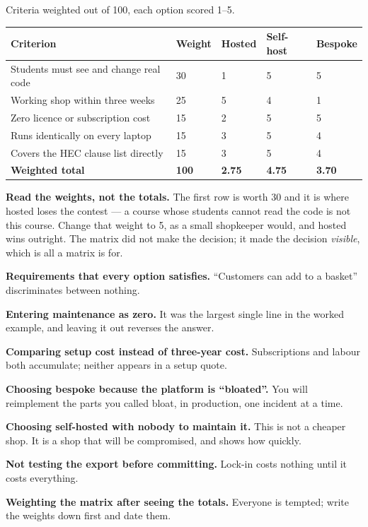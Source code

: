 \begin{examplebox}
Criteria weighted out of 100, each option scored 1--5.

\begin{longtable}{@{}L{4.8cm}L{1.5cm}L{1.9cm}L{1.9cm}L{1.9cm}@{}}
\toprule
{}
\textbf{Criterion} & \textbf{Weight} & \textbf{Hosted} & \textbf{Self-host} &
\textbf{Bespoke} \\
\midrule
\endhead
Students must see and change real code & 30 & 1 & 5 & 5 \\
Working shop within three weeks & 25 & 5 & 4 & 1 \\
Zero licence or subscription cost & 15 & 2 & 5 & 5 \\
Runs identically on every laptop & 15 & 3 & 5 & 4 \\
Covers the HEC clause list directly & 15 & 3 & 5 & 4 \\
\midrule
\textbf{Weighted total} & \textbf{100} & \textbf{2.75} & \textbf{4.75} &
\textbf{3.70} \\
\bottomrule
\end{longtable}

\smallskip
\textbf{Read the weights, not the totals.} The first row is worth 30 and it is
where hosted loses the contest --- a course whose students cannot read the code
is not this course. Change that weight to 5, as a small shopkeeper would, and
hosted wins outright. The matrix did not make the decision; it made the
decision \emph{visible}, which is all a matrix is for.
\end{examplebox}

\begin{pitfall}
\begin{tight}
  \item \textbf{Requirements that every option satisfies.} ``Customers can add
        to a basket'' discriminates between nothing.
  \item \textbf{Entering maintenance as zero.} It was the largest single line
        in the worked example, and leaving it out reverses the answer.
  \item \textbf{Comparing setup cost instead of three-year cost.} Subscriptions
        and labour both accumulate; neither appears in a setup quote.
  \item \textbf{Choosing bespoke because the platform is ``bloated''.} You will
        reimplement the parts you called bloat, in production, one incident at
        a time.
  \item \textbf{Choosing self-hosted with nobody to maintain it.} This is not a
        cheaper shop. It is a shop that will be compromised, and
         shows how quickly.
  \item \textbf{Not testing the export before committing.} Lock-in costs
        nothing until it costs everything.
  \item \textbf{Weighting the matrix after seeing the totals.} Everyone is
        tempted; write the weights down first and date them.
\end{tight}
\end{pitfall}

